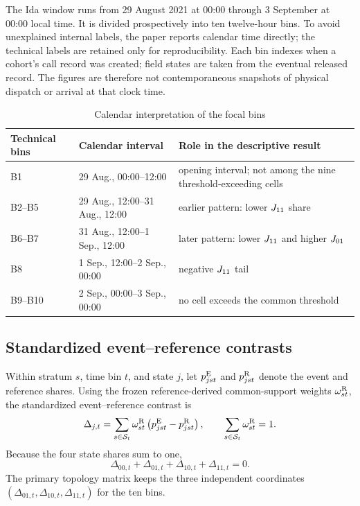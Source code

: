 \documentclass[11pt]{article}
\begin{document}
The Ida window runs from 29 August 2021 at 00:00 through 3 September at 00:00 local time. It is divided prospectively into ten twelve-hour bins. To avoid unexplained internal labels, the paper reports calendar time directly; the technical labels are retained only for reproducibility. Each bin indexes when a cohort's call record was created; field states are taken from the eventual released record. The figures are therefore not contemporaneous snapshots of physical dispatch or arrival at that clock time.

\begin{table}[H]
\centering
\caption{Calendar interpretation of the focal bins}
\label{tab:bins}
\begin{tabularx}{\textwidth}{@{}l l X@{}}
\toprule
Technical bins & Calendar interval & Role in the descriptive result \\
\midrule
B1 & 29 Aug., 00:00--12:00 & opening interval; not among the nine threshold-exceeding cells \\
B2--B5 & 29 Aug., 12:00--31 Aug., 12:00 & earlier pattern: lower $J_{11}$ share \\
B6--B7 & 31 Aug., 12:00--1 Sep., 12:00 & later pattern: lower $J_{11}$ and higher $J_{01}$ \\
B8 & 1 Sep., 12:00--2 Sep., 00:00 & negative $J_{11}$ tail \\
B9--B10 & 2 Sep., 00:00--3 Sep., 00:00 & no cell exceeds the common threshold \\
\bottomrule
\end{tabularx}
\end{table}

\subsection{Standardized event--reference contrasts}

Within stratum $s$, time bin $t$, and state $j$, let $p^{\mathrm{E}}_{jst}$ and $p^{\mathrm{R}}_{jst}$ denote the event and reference shares. Using the frozen reference-derived common-support weights $\omega^{\mathrm{R}}_{st}$, the standardized event--reference contrast is
\begin{equation}
\Delta_{j,t}=\sum_{s\in\mathcal S_t}\omega^{\mathrm{R}}_{st}
\left(p^{\mathrm{E}}_{jst}-p^{\mathrm{R}}_{jst}\right),
\qquad
\sum_{s\in\mathcal S_t}\omega^{\mathrm{R}}_{st}=1.
\label{eq:delta}
\end{equation}
Because the four state shares sum to one,
\begin{equation}
\Delta_{00,t}+\Delta_{01,t}+\Delta_{10,t}+\Delta_{11,t}=0.
\label{eq:simplex}
\end{equation}
The primary topology matrix keeps the three independent coordinates $(\Delta_{01,t},\Delta_{10,t},\Delta_{11,t})$ for the ten bins.
\end{document}

